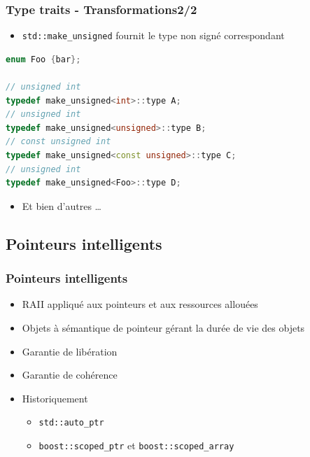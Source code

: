 \documentclass[C++.tex]{subfiles}
\begin{document}
\begin{frame}[fragile]
	\frametitle{Type traits - Transformations\titlehfill{}2/2}
	\begin{itemize}
		\item \lstinline|std::make_unsigned| fournit le type non signé correspondant
	\end{itemize}

	\begin{lstlisting}[language=C++]
enum Foo {bar};

// unsigned int
typedef make_unsigned<int>::type A;
// unsigned int
typedef make_unsigned<unsigned>::type B;
// const unsigned int
typedef make_unsigned<const unsigned>::type C;
// unsigned int
typedef make_unsigned<Foo>::type D;\end{lstlisting}

	\begin{itemize}
		\item Et bien d'autres \ldots
	\end{itemize}
\end{frame}

\subsection*{Pointeurs intelligents}
\begin{frame}[fragile]
	\frametitle{Pointeurs intelligents}
	\begin{itemize}
		\item RAII appliqué aux pointeurs et aux ressources allouées
		\item Objets à sémantique de pointeur gérant la durée de vie des objets
		\item Garantie de libération
		\item Garantie de cohérence
		\item Historiquement
		\begin{itemize}
			\item \lstinline|std::auto_ptr|
			\item \lstinline|boost::scoped_ptr| et \lstinline|boost::scoped_array|
		\end{itemize}
	\end{itemize}
\end{frame}
\end{document}
